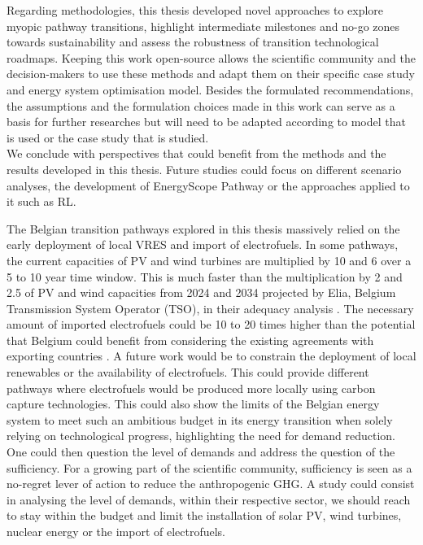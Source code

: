 Regarding methodologies, this thesis developed novel approaches to explore myopic pathway transitions, highlight intermediate milestones and no-go zones towards sustainability and assess the robustness of transition technological roadmaps. Keeping this work open-source allows the scientific community and the decision-makers to use these methods and adapt them on their specific case study and energy system optimisation model. Besides the formulated recommendations, the assumptions and the formulation choices made in this work can serve as a basis for further researches but will need to be adapted according to model that is used or the case study that is studied.\\


We conclude with perspectives that could benefit from the methods and the results developed in this thesis.  Future studies could focus on different scenario analyses, the development of EnergyScope Pathway or the approaches applied to it such as \gls{RL}. 

The Belgian transition pathways explored in this thesis massively relied on the early deployment of local \gls{VRES} and import of electrofuels. In some pathways, the current capacities of \gls{PV} and wind turbines are multiplied by 10 and 6 over a 5 to 10 year time window. This is much faster than the multiplication by 2 and 2.5 of PV and wind capacities from 2024 and 2034 projected by Elia, Belgium Transmission System Operator (TSO), in their adequacy analysis \cite{Elia_2024_2034}. The necessary amount of imported electrofuels could be 10 to 20 times higher than the potential that Belgium could benefit from considering the existing agreements with exporting countries \cite{lefebvre2022electrofuel}. A future work would be to constrain the deployment of local renewables or the availability of electrofuels. This could provide different pathways where electrofuels would be produced more locally using carbon capture technologies. This could also show the limits of the Belgian energy system to meet such an ambitious  budget in its energy transition when solely relying on technological progress, highlighting the need for demand reduction. One could then question the level of demands and address the question of the sufficiency. For a growing part of the scientific community, sufficiency is seen as a no-regret lever of action to reduce the anthropogenic \gls{GHG}. A study could consist in analysing the level of demands, within their respective sector, we should reach to stay within the  budget and limit the installation of solar PV, wind turbines, nuclear energy or the import of electrofuels.

